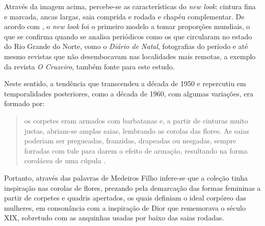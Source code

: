 \begin{refsection}
    Através da imagem acima, percebe-se as características do \textit{new look}: cintura fina e marcada, ancas largas, saia comprida e rodada e chapéu complementar. De acordo com \textcite{MedeirosFl2014Arremedando}, o \textit{new look} foi o primeiro modelo a tomar proporções mundiais, o que se confirma quando se analisa periódicos como os que circularam no estado do Rio Grande do Norte, como o \textit{Diário de Natal}, fotografias do período e até mesmo revistas que não desembocavam nas localidades mais remotas, a exemplo da revista \textit{O Cruzeiro}, também fonte para este estudo.

    Neste sentido, a tendência que transcendeu a década de 1950 e repercutiu em temporalidades posteriores, como a década de 1960, com algumas variações, era formado por:

    \begin{quotation}
        \noindent{}os corpetes eram armados com barbatanas e, a partir de cinturas muito justas, abriam-se amplas saias, lembrando as corolas das flores. As saias poderiam ser pregueadas, franzidas, drapeadas ou nesgadas, sempre forradas com tule para darem o efeito de armação, resultando na forma corolácea de uma cúpula \cite[p.~116]{MedeirosFl2014Arremedando}.
    \end{quotation}

    Portanto, através das palavras de Medeiros Filho infere-se que a coleção tinha inspiração nas corolas de flores, prezando pela demarcação das formas femininas a partir de corpetes e quadris apertados, os quais definiam o ideal corpóreo das mulheres, em consonância com a inspiração de Dior que rememorava o século XIX, sobretudo com as anquinhas usadas por baixo das saias rodadas. 


\end{refsection}
